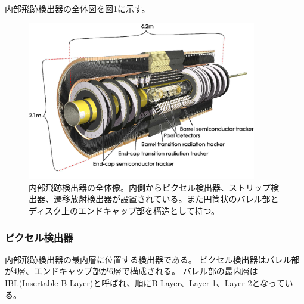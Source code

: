 内部飛跡検出器の全体図を図\ref{inner_detector}に示す。

\begin{figure}[bpt]\centering
\includegraphics[width=10cm]{./inner_detector.png}
\caption[内部飛跡検出器の全体像]{内部飛跡検出器の全体像\cite{1-2}。内側からピクセル検出器、ストリップ検出器、遷移放射検出器が設置されている。また円筒状のバレル部とディスク上のエンドキャップ部を構造として持つ。}
\label{inner_detector}
\end{figure}


%

\subsubsection{ピクセル検出器}

内部飛跡検出器の最内層に位置する検出器である。
ピクセル検出器はバレル部が4層、エンドキャップ部が6層で構成される。
バレル部の最内層はIBL(Insertable B-Layer)と呼ばれ、順にB-Layer、Layer-1、Layer-2となっている。

